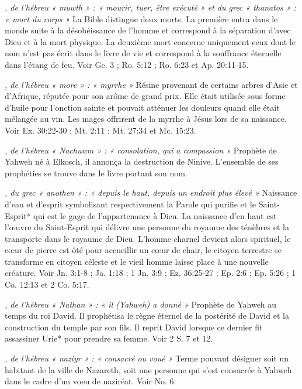 \begin{multicols}{2}
{\textit{, de l'hébreu « muwth » : « mourir, tuer, être exécuté » et du grec « thanatos » : « mort du corps »}\newline
La Bible distingue deux morts. La première entra dans le monde suite à la désobéissance de l'homme et correspond à la séparation d'avec Dieu et à la mort physique. La deuxième mort concerne uniquement ceux dont le nom n'est pas écrit dans le livre de vie et correspond à la souffrance éternelle dans l'étang de feu. Voir Ge. 3 ; Ro. 5:12 ; Ro. 6:23 et Ap. 20:11-15.

\textit{, de l'hébreu « more » : « myrrhe »}\newline
Résine provenant de certains arbres d'Asie et d'Afrique, réputée pour son arôme de grand prix. Elle était utilisée sous forme d'huile pour l'onction sainte et pouvait atténuer les douleurs quand elle était mélangée au vin. Les mages offrirent de la myrrhe à Jésus lors de sa naissance. Voir Ex. 30:22-30 ; Mt. 2:11 ; Mt. 27:34 et Mc. 15:23.

\textit{, de l'hébreu « Nachuwm » : « consolation, qui a compassion »}\newline
Prophète de Yahweh né à Elkosch, il annonça la destruction de Ninive. L'ensemble de ses prophéties se trouve dans le livre portant son nom.

\textit{, du grec « anothen » : « depuis le haut, depuis un endroit plus élevé »}\newline
Naissance d'eau et d'esprit symbolisant respectivement la Parole qui purifie et le Saint-Esprit* qui est le gage de l'appartenance à Dieu. La naissance d'en haut est l'œuvre du Saint-Esprit qui délivre une personne du royaume des ténèbres et la transporte dans le royaume de Dieu. L'homme charnel devient alors spirituel, le cœur de pierre est ôté pour accueillir un cœur de chair, le citoyen terrestre se transforme en citoyen céleste et le vieil homme laisse place à une nouvelle créature. Voir Jn. 3:1-8 ; Ja. 1:18 ; 1 Jn. 3:9 ; Ez. 36:25-27 ; Ep. 2:6 ; Ep. 5:26 ; 1 Co. 12:13 et 2 Co. 5:17.

\textit{, de l'hébreu « Nathan » : « il (Yahweh) a donné »}\newline
Prophète de Yahweh au temps du roi David. Il prophétisa le règne éternel de la postérité de David et la construction du temple par son fils. Il reprit David lorsque ce dernier fit assassiner Urie* pour prendre sa femme. Voir 2 S. 7 et 12.

\textit{, de l'hébreu « naziyr » : « consacré ou voué »}\newline
Terme pouvant désigner soit un habitant de la ville de Nazareth, soit une personne qui s'est consacrée à Yahweh dans le cadre d'un voeu de naziréat. Voir No. 6.

}
\end{multicols}
